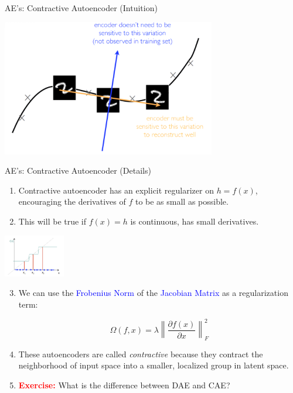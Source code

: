 \documentclass[serif, aspectratio=169]{beamer}
\begin{document}
\begin{frame}{AE’s: Contractive Autoencoder (Intuition)}
      \begin{center}
        \includegraphics[width=0.7\textwidth]{pic/CAE Intuition2.png} 
    \end{center}
\end{frame}


\begin{frame}{AE’s: Contractive Autoencoder (Details)}
    \scriptsize
    \begin{enumerate}
        \item Contractive autoencoder has an explicit regularizer on \( h = f(x) \), encouraging the derivatives of \( f \) to be as small as possible.
        \item This will be true if \( f(x) = h \) is continuous, has small derivatives.
    \end{enumerate}

    \begin{center}
        \includegraphics[width=0.2\textwidth]{pic/CAE details1.png}
    \end{center}

    \begin{enumerate}
        \setcounter{enumi}{2} %
        \item We can use the \textcolor{blue}{Frobenius Norm} of the \textcolor{blue}{Jacobian Matrix} as a regularization term:
        
        \[
        \Omega(f, x) = \lambda \left\| \frac{\partial f(x)}{\partial x} \right\|^2_F
        \]
        
        \item These autoencoders are called \textit{contractive} because they contract the neighborhood of input space into a smaller, localized group in latent space.
        
        \item \textbf{\textcolor{red}{Exercise:}} What is the difference between DAE and CAE?
    \end{enumerate}
    
    \vspace{0.4cm}
\end{frame}
\end{document}
